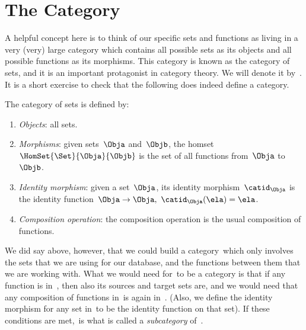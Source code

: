 
\section{The Category \Set}

A helpful concept here is to think of our specific sets and functions as living in a very (very) large category which contains all possible sets as its objects and all possible functions as its morphisms.
This category is known as the category of sets, and it is an important protagonist in category theory.
We will denote it by~\Set.
It is a short exercise to check that the following does indeed define a category.

\begin{ctdefinition}
	\label{def:Set}
	The category of sets \iindex{\Set} is defined by:
	\begin{enumerate}
		\item \emph{Objects}: all sets.
		\item \emph{Morphisms}: given sets~$\Obja$ and~$\Objb$, the homset~$\HomSet{\Set}{\Obja}{\Objb}$ is the set of all functions from~$\Obja$ to~$\Objb$.
		\item \emph{Identity morphism}: given a set~$\Obja$, its identity morphism~$\catid_\Obja$ is the identity function~$\Obja \to \Obja, \ \catid_\Obja(\ela) = \ela$.
		\item \emph{Composition operation}: the composition operation is the usual composition of functions.
	\end{enumerate}
\end{ctdefinition}

We did say above, however, that we could build a category~\Database which only involves the sets that we are using for our database, and the functions between them that we are working with.
What we would need for~\Database to be a category is that if any function is in~\Database, then also its sources and target sets are, and we would need that any composition of functions in~\Database is again in~\Database. (Also, we define the identity morphism for any set in~\Database to be the identity function on that set).
If these conditions are met,~\Database is what is called a \emph{subcategory} of~\Set.
